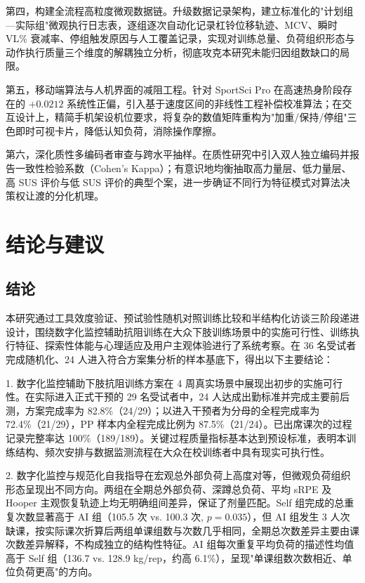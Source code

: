 \documentclass[UTF8,zihao=-4,twoside,openany]{ctexbook}
\begin{document}
第四，构建全流程高粒度微观数据链。升级数据记录架构，建立标准化的"计划组—实际组"微观执行日志表，逐组逐次自动化记录杠铃位移轨迹、MCV、瞬时 VL\% 衰减率、停组触发原因与人工覆盖记录，实现对训练总量、负荷组织形态与动作执行质量三个维度的解耦独立分析，彻底攻克本研究未能归因组数缺口的局限。

第五，移动端算法与人机界面的减阻工程。针对 SportSci Pro 在高速热身阶段存在的 $+0.0212$ 系统性正偏，引入基于速度区间的非线性工程补偿校准算法；在交互设计上，精简手机架设机位要求，将复杂的数值矩阵重构为"加重/保持/停组"三色即时可视卡片，降低认知负荷，消除操作摩擦。

第六，深化质性多编码者审查与跨水平抽样。在质性研究中引入双人独立编码并报告一致性检验系数（Cohen's Kappa）；有意识地均衡抽取高力量层、低力量层、高 SUS 评价与低 SUS 评价的典型个案，进一步确证不同行为特征模式对算法决策权让渡的分化机理。
\clearpage
\chapter{结论与建议}

\section{结论}
本研究通过工具效度验证、预试验性随机对照训练比较和半结构化访谈三阶段递进设计，围绕数字化监控辅助抗阻训练在大众下肢训练场景中的实施可行性、训练执行特征、探索性体能与心理适应及用户主观体验进行了系统考察。在 36 名受试者完成随机化、24 人进入符合方案集分析的样本基底下，得出以下主要结论：

1. 数字化监控辅助下肢抗阻训练方案在 4 周真实场景中展现出初步的实施可行性。在实际进入正式干预的 29 名受试者中，24 人达成出勤标准并完成主要前后测，方案完成率为 82.8\%（24/29）；以进入干预者为分母的全程完成率为 72.4\%（21/29），PP 样本内全程完成比例为 87.5\%（21/24）。已出席课次的过程记录完整率达 100\%（189/189）。关键过程质量指标基本达到预设标准，表明本训练结构、频次安排与数据监测流程在大众在校训练者中具有现实可执行性。

2. 数字化监控与规范化自我指导在宏观总外部负荷上高度对等，但微观负荷组织形态呈现出不同方向。两组在全期总外部负荷、深蹲总负荷、平均 sRPE 及 Hooper 主观恢复轨迹上均无明确组间差异，保证了剂量匹配。Self 组完成的总重复次数显著高于 AI 组（105.5 次 vs. 100.3 次, $p=0.035$），但 AI 组发生 3 人次缺课，按实际课次折算后两组单课组数与次数几乎相同，全期总次数差异主要由课次数差异解释，不构成独立的结构性特征。AI 组每次重复平均负荷的描述性均值高于 Self 组（136.7 vs. 128.9 kg/rep，约高 6.1\%），呈现"单课组数次数相近、单位负荷更高"的方向。
\end{document}
